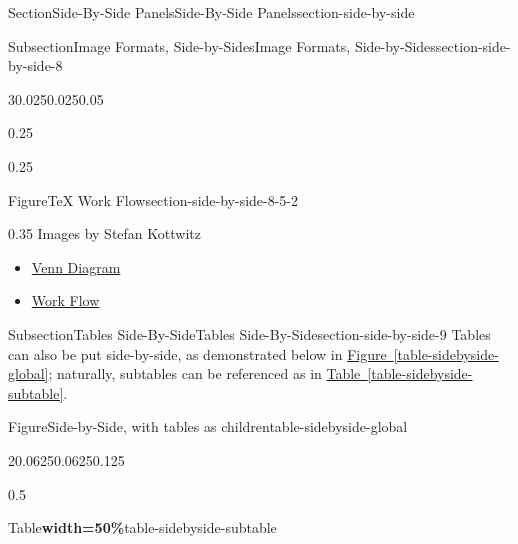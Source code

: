 \documentclass[twoside,10pt,]{article}
\newcommand{\tabularfont}{\relax}
\newcommand{\xreffont}{\relax}
\numberwithin{equation}{section}
\newcommand{\hrulethin}  {\noalign{\hrule height 0.04em}}
\newcommand{\hrulemedium}{\noalign{\hrule height 0.07em}}
\begin{document}
\begin{sectionptx}{Section}{Side-By-Side Panels}{}{Side-By-Side Panels}{}{}{section-side-by-side}
\begin{subsectionptx}{Subsection}{Image Formats, Side-by-Sides}{}{Image Formats, Side-by-Sides}{}{}{section-side-by-side-8}
\begin{sidebyside}{3}{0.025}{0.025}{0.05}
\begin{sbspanel}{0.25}
{%
}%
\end{sbspanel}%
\begin{sbspanel}{0.25}%
\begin{panelfigureptx}{Figure}{\TeX{} Work Flow}{section-side-by-side-8-5-2}{}%
\noindent{}%
\tcblower
\end{panelfigureptx}%
\end{sbspanel}%
\begin{sbspanel}{0.35}%
Images by Stefan Kottwitz%
\begin{itemize}[label=\textbullet]
\item{}\href{http://www.texample.net/tikz/examples/venn/}{Venn Diagram}%
\item{}\href{http://www.texample.net/tikz/examples/smart-circle/}{Work Flow}%
\end{itemize}
%
\end{sbspanel}%
\end{sidebyside}%
\end{subsectionptx}
%
%
\typeout{************************************************}
\typeout{************************************************}
%
\begin{subsectionptx}{Subsection}{Tables Side-By-Side}{}{Tables Side-By-Side}{}{}{section-side-by-side-9}
Tables can also be put side-by-side, as demonstrated below in \hyperref[table-sidebyside-global]{Figure~{\xreffont\ref{table-sidebyside-global}}}; naturally, subtables can be referenced as in \hyperref[table-sidebyside-subtable]{Table~{\xreffont\ref{table-sidebyside-subtable}}}.%
\begin{figureptx}{Figure}{Side-by-Side, with tables as children}{table-sidebyside-global}{}%
\begin{sidebyside}{2}{0.0625}{0.0625}{0.125}%
\begin{sbspanel}{0.5}%
\begin{subtableptx}{Table}{\textbf{width=50\%}}{table-sidebyside-subtable}{}%
\noindent\resizebox{\ifdim\width > \linewidth\linewidth\else\width\fi}{!}{%
{\centering%
{\tabularfont%
\begin{tabular}{AcBcCc}\hrulethin
1111&\multicolumn{1}{cA}{2222}\tabularnewline\hrulemedium

\end{tabular}}}}
\end{subtableptx}
\end{sbspanel}
\end{sidebyside}
\end{figureptx}
\end{subsectionptx}
\end{sectionptx}
\end{document}
